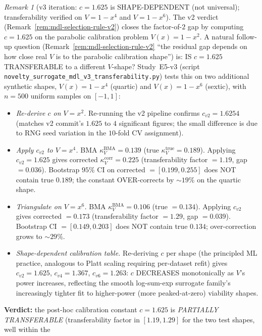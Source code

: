\documentclass[11pt,a4paper]{article}
\theoremstyle{plain}
\theoremstyle{definition}
\theoremstyle{remark}
\newtheorem{remark}[theorem]{Remark}
\newcommand{\kk}{\kappa_{\!V}}
\begin{document}
\begin{remark}[v3 iteration: $c = 1.625$ is SHAPE-DEPENDENT (not
universal); transferability verified on $V = 1 - x^4$ and $V = 1 - x^6$]
\label{rem:mdl-selection-rule-v3}
The v2 verdict (Remark~\ref{rem:mdl-selection-rule-v2}) closes the
factor-of-$2$ gap by computing $c = 1.625$ on the parabolic
calibration problem $V(x) = 1 - x^2$. A natural follow-up question
(Remark~\ref{rem:mdl-selection-rule-v2} ``the residual gap depends on
how close real $V$ is to the parabolic calibration shape'') is: IS $c =
1.625$ TRANSFERABLE to a different $V$-shape? Study~E5-v3 (script
\texttt{novelty\_surrogate\_mdl\_v3\_transferability.py}) tests this
on two additional synthetic shapes, $V(x) = 1 - x^4$ (quartic) and
$V(x) = 1 - x^6$ (sextic), with $n = 500$ uniform samples on $[-1, 1]$:
\begin{itemize}
\item[(i)] \emph{Re-derive $c$ on $V = x^2$.} Re-running the v2
  pipeline confirms $c_{v2} = 1.6254$ (matches v2 commit's $1.625$ to
  $4$ significant figures; the small difference is due to RNG seed
  variation in the $10$-fold CV assignment).
\item[(ii)] \emph{Apply $c_{v2}$ to $V = x^4$.} BMA $\kk^{\mathrm{BMA}}
  = 0.139$ (true $\kk^{\mathrm{true}} = 0.189$). Applying $c_{v2} =
  1.625$ gives corrected $\kk^{\mathrm{corr}} = 0.225$
  (transferability factor $= 1.19$, gap $= 0.036$). Bootstrap
  $95\%$ CI on corrected $= [0.199, 0.255]$ does NOT contain true
  $0.189$; the constant OVER-corrects by $\sim 19\%$ on the quartic
  shape.
\item[(iii)] \emph{Triangulate on $V = x^6$.} BMA
  $\kk^{\mathrm{BMA}} = 0.106$ (true $= 0.134$). Applying $c_{v2}$
  gives corrected $= 0.173$ (transferability factor $= 1.29$,
  gap $= 0.039$). Bootstrap CI $= [0.149, 0.203]$ does NOT contain
  true $0.134$; over-correction grows to $\sim 29\%$.
\item[(iv)] \emph{Shape-dependent calibration table.} Re-deriving
  $c$ per shape (the principled ML practice, analogous to Platt
  scaling requiring per-dataset refit) gives
  $c_{v2} = 1.625$, $c_{v4} = 1.367$, $c_{v6} = 1.263$:
  $c$ DECREASES monotonically as $V$'s power increases, reflecting
  the smooth log-sum-exp surrogate family's increasingly tighter fit
  to higher-power (more peaked-at-zero) viability shapes.
\end{itemize}
\textbf{Verdict:} the post-hoc calibration constant $c = 1.625$ is
\emph{PARTIALLY TRANSFERABLE} (transferability factor in
$[1.19, 1.29]$ for the two test shapes, well within the

\end{remark}
\end{document}
